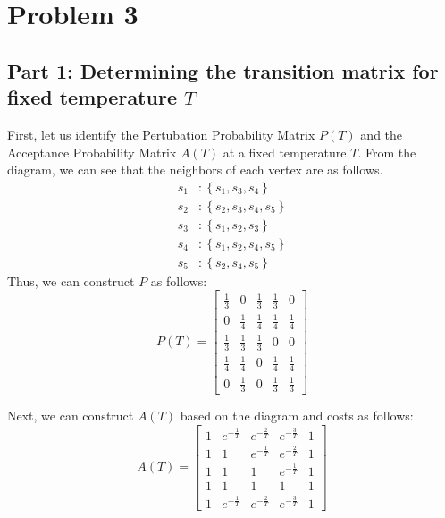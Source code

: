 \section*{Problem 3}

\subsection*{Part 1: Determining the transition matrix for fixed temperature \(T\)}

First, let us identify the Pertubation Probability Matrix \(P(T)\) and the Acceptance Probability Matrix \(A(T)\) at a fixed temperature \(T\). From the diagram, we can see that the neighbors of each vertex are as follows.
\[
\begin{aligned}
    s_1 &: \left\{s_1, s_3, s_4\right\} \\
    s_2 &: \left\{s_2, s_3, s_4, s_5\right\} \\
    s_3 &: \left\{s_1, s_2, s_3\right\} \\
    s_4 &: \left\{s_1, s_2, s_4, s_5\right\} \\
    s_5 &: \left\{s_2, s_4, s_5\right\}
\end{aligned}
\]
Thus, we can construct \(P\) as follows:
\[
    P(T) = \begin{bmatrix}
        \frac{1}{3} & 0 & \frac{1}{3} & \frac{1}{3} & 0 \\
        0 & \frac{1}{4} & \frac{1}{4} & \frac{1}{4} & \frac{1}{4} \\
        \frac{1}{3} & \frac{1}{3} & \frac{1}{3} & 0 & 0 \\
        \frac{1}{4} & \frac{1}{4} & 0 & \frac{1}{4} & \frac{1}{4} \\
        0 & \frac{1}{3} & 0 & \frac{1}{3} & \frac{1}{3}
    \end{bmatrix}
\]

Next, we can construct \(A(T)\) based on the diagram and costs as follows:
\[
    A(T) = \begin{bmatrix}
        1 & e^{-\frac1T} & e^{-\frac2T} & e^{-\frac3T} & 1 \\
        1 & 1 & e^{-\frac1T} & e^{-\frac2T} & 1 \\
        1 & 1 & 1 & e^{-\frac1T} & 1 \\
        1 & 1 & 1 & 1 & 1 \\
        1 & e^{-\frac1T} & e^{-\frac2T} & e^{-\frac3T} & 1
    \end{bmatrix}
\]

